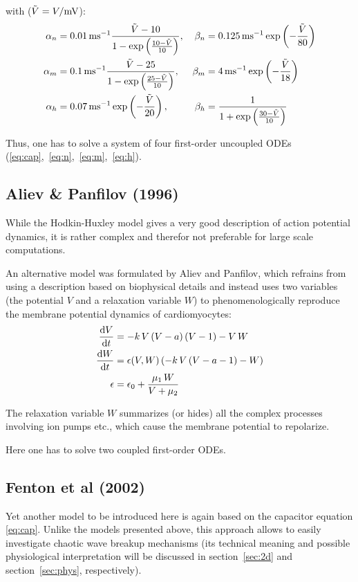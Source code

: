 with ($\tilde{V}=V/\si{\milli\volt}$):
\begin{align*}
    \alpha_{n}&=\SI{.01}{\per\milli\second}
        \frac{\tilde{V}-10}{1-
            \exp\left(\frac{10-\tilde{V}}{10}\right)},&
    \beta_{n}&=\SI{.125}{\per\milli\second}
        \exp\left(-\frac{\tilde{V}}{80}\right) \\
    \alpha_{m}&=\SI{.1}{\per\milli\second}
        \frac{\tilde{V}-25}{1-
            \exp\left(\frac{25-\tilde{V}}{10}\right)},&
    \beta_{m}&=\SI{4}{\per\milli\second}
        \exp\left(-\frac{\tilde{V}}{18}\right) \\
    \alpha_{h}&=\SI{.07}{\per\milli\second}
        \exp\left(-\frac{\tilde{V}}{20}\right),&
    \beta_{h}&=\frac{1}{1+
        \exp\left(\frac{30-\tilde{V}}{10}\right)}
\end{align*}

Thus, one has to solve a system of four first-order uncoupled ODEs
(\ref{eq:cap},~\ref{eq:n},~\ref{eq:m},~\ref{eq:h}).


\subsection{Aliev \& Panfilov (1996)}
While the Hodkin-Huxley model gives a very good description of
action potential dynamics, it is rather complex and therefor not preferable
for large scale computations.

An alternative model was formulated by Aliev and Panfilov, which refrains
from using a description based on biophysical details and instead uses two
variables (the potential $V$ and a relaxation variable $W$) to
phenomenologically reproduce the membrane potential dynamics of
cardiomyocytes:
\begin{subequations}
\begin{align}
    \dv{V}{t}&=-k\,V\,(V-a)\,(V-1)-V\,W \label{eq:ap_pot} \\
    \dv{W}{t}&=\epsilon(V, W)\,(-k\,V\,(V-a-1)-W) \label{eq:ap_relax} \\
    \epsilon&=\epsilon_0+\frac{\mu_1\,W}{V+\mu_2} \nonumber
\end{align}
\label{eq:ap_eqs}
\end{subequations}

The relaxation variable $W$ summarizes (or hides) all the complex processes
involving ion pumps etc., which cause the membrane potential to repolarize.

Here one has to solve two coupled first-order ODEs.

\subsection{Fenton et al (2002)}
Yet another model to be introduced here is again based on the capacitor
equation \eqref{eq:cap}. Unlike the models presented above, this approach
allows to easily investigate chaotic wave breakup mechanisms (its technical
meaning and possible physiological interpretation will be discussed in
section~\ref{sec:2d} and section~\ref{sec:phys}, respectively).

